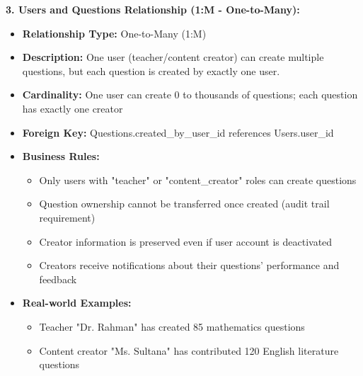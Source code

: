 \documentclass[12pt,a4paper,oneside]{book}
\begin{document}
\textbf{3. Users and Questions Relationship (1:M - One-to-Many):}
\begin{itemize}
    \item \textbf{Relationship Type:} One-to-Many (1:M)
    \item \textbf{Description:} One user (teacher/content creator) can create multiple questions, but each question is created by exactly one user.
    \item \textbf{Cardinality:} One user can create 0 to thousands of questions; each question has exactly one creator
    \item \textbf{Foreign Key:} Questions.created\_by\_user\_id references Users.user\_id
    \item \textbf{Business Rules:}
        \begin{itemize}
            \item Only users with "teacher" or "content\_creator" roles can create questions
            \item Question ownership cannot be transferred once created (audit trail requirement)
            \item Creator information is preserved even if user account is deactivated
            \item Creators receive notifications about their questions' performance and feedback
        \end{itemize}
    \item \textbf{Real-world Examples:}
        \begin{itemize}
            \item Teacher "Dr. Rahman" has created 85 mathematics questions
            \item Content creator "Ms. Sultana" has contributed 120 English literature questions
        \end{itemize}
\end{itemize}
\end{document}
